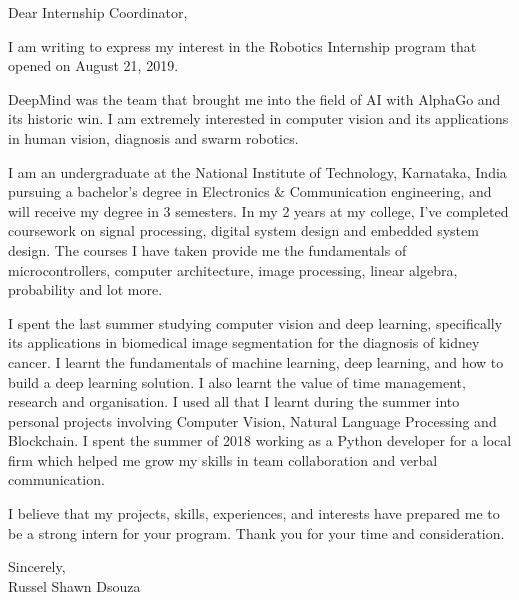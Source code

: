 \documentclass[11pt,a4paper,sans]{moderncv}
\begin{document}
  \date{August 23, 2019}
  \opening{Dear Internship Coordinator,}
  \makelettertitle

  I am writing to express my interest in the Robotics Internship program that opened on August 21, 2019. 
  
  DeepMind was the team that brought me into the field of AI with AlphaGo and its historic win. I am extremely interested in computer vision and its applications in human vision, diagnosis and swarm robotics.

  I am an undergraduate at the National Institute of Technology, Karnataka, India pursuing a bachelor's degree in Electronics \& Communication
  engineering, and will receive my degree in 3 semesters. In my 2 years at my college, I've completed coursework on signal processing, digital system design and embedded system design. The courses I have taken provide me the fundamentals of microcontrollers, computer architecture, image processing, linear algebra, probability and lot more.

  I spent the last summer studying computer vision and deep learning, specifically its applications in biomedical image segmentation for the diagnosis of kidney cancer. I learnt the fundamentals of machine learning, deep learning, and how to build a deep learning solution. I also learnt the value of time management, research and organisation. I used all that I learnt during the summer into personal projects involving Computer Vision, Natural Language Processing and Blockchain. I spent the summer of 2018 working as a Python developer for a local firm which helped me grow my skills in team collaboration and verbal communication.

  I believe that my projects, skills, experiences, and interests have prepared me to be a strong intern for your program.
  Thank you for your time and consideration.

  Sincerely,\\
  Russel Shawn Dsouza
\end{document}
